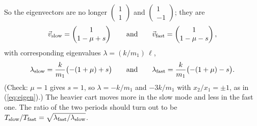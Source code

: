 \documentclass[12pt]{article}
\numberwithin{equation}{section}
\begin{document}
So the eigenvectors are no longer
$\left(\begin{smallmatrix} 1 \\ 1 \end{smallmatrix}\right)$ and
$\left(\begin{smallmatrix} 1 \\ -1 \end{smallmatrix}\right)$; they are
\begin{equation}
  \label{eq:unequal}
  \vec{v}_{\rm slow} = \begin{pmatrix} 1 \\ 1 - \mu + s \end{pmatrix}
  \qquad\text{and}\qquad
  \vec{v}_{\rm fast} = \begin{pmatrix} 1 \\ 1 - \mu - s \end{pmatrix},
\end{equation}
with corresponding eigenvalues $\lambda = (k/m_1)\,\ell$,
\begin{equation}
  \label{eq:unequal-lambda}
  \lambda_{\rm slow} = \frac{k}{m_1}\bigl(-(1+\mu) + s\bigr)
  \qquad\text{and}\qquad
  \lambda_{\rm fast} = \frac{k}{m_1}\bigl(-(1+\mu) - s\bigr).
\end{equation}
(Check: $\mu = 1$ gives $s = 1$, so $\lambda = -k/m_1$ and $-3k/m_1$ with
$x_2/x_1 = \pm 1$, as in (\ref*{eq:eigen}).) The heavier cart moves more
in the slow mode and less in the fast one. The ratio of the two periods
should turn out to be $T_{\rm slow}/T_{\rm fast} =
\sqrt{\lambda_{\rm fast}/\lambda_{\rm slow}}$.

\medskip
\end{document}
